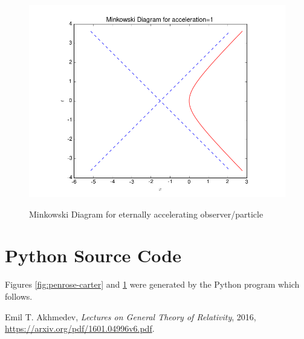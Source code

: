 \documentclass[]{article}
\begin{document}
\begin{figure}[H]
	\caption{Minkowski Diagram for eternally accelerating observer/particle}
	\centering
	\includegraphics[width=1.0\textwidth]{GR-Problem-5-1-1.png}
	\label{fig:minkowski}
\end{figure}

\section{Python Source Code}\label{section:source}

Figures \ref{fig:penrose-carter} and \ref{fig:minkowski} were generated by the Python program which follows.


\begin{thebibliography}{9}
	
	Emil T. Akhmedev,
	\emph{Lectures on General Theory of Relativity},
	2016,
	\url{https://arxiv.org/pdf/1601.04996v6.pdf}.

\end{thebibliography}
\end{document}
